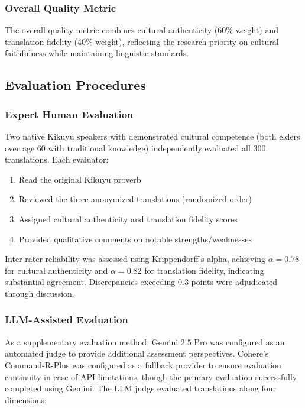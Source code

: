 \subsubsection{Overall Quality Metric}
\label{subsubsec:overall_quality}

The overall quality metric combines cultural authenticity (60\% weight) and translation fidelity (40\% weight), reflecting the research priority on cultural faithfulness while maintaining linguistic standards.

\subsection{Evaluation Procedures}
\label{subsec:eval_procedures}

\subsubsection{Expert Human Evaluation}
\label{subsubsec:expert_evaluation}

Two native Kikuyu speakers with demonstrated cultural competence (both elders over age 60 with traditional knowledge) independently evaluated all 300 translations. Each evaluator:

\begin{enumerate}
    \item Read the original Kikuyu proverb
    \item Reviewed the three anonymized translations (randomized order)
    \item Assigned cultural authenticity and translation fidelity scores
    \item Provided qualitative comments on notable strengths/weaknesses
\end{enumerate}

Inter-rater reliability was assessed using Krippendorff's alpha, achieving $\alpha = 0.78$ for cultural authenticity and $\alpha = 0.82$ for translation fidelity, indicating substantial agreement. Discrepancies exceeding 0.3 points were adjudicated through discussion.

\subsubsection{LLM-Assisted Evaluation}
\label{subsubsec:llm_evaluation}

As a supplementary evaluation method, Gemini 2.5 Pro was configured as an automated judge to provide additional assessment perspectives. Cohere's Command-R-Plus was configured as a fallback provider to ensure evaluation continuity in case of API limitations, though the primary evaluation successfully completed using Gemini. The LLM judge evaluated translations along four dimensions:

